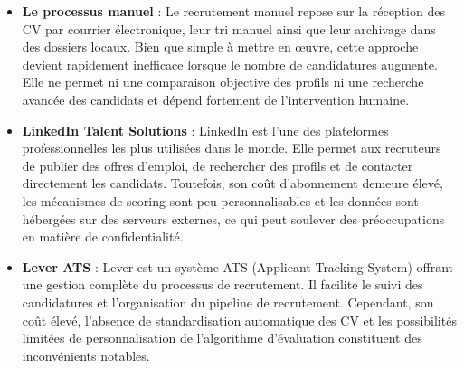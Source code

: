\documentclass[12pt,a4paper,oneside]{report}
\begin{document}
\begin{itemize}
\begin{center}
\end{center}

\section{Étude de l'existant}
\subsection{Analyse de l'existant}

Afin d'identifier les limites des approches actuelles et de justifier la solution proposée, nous avons étudié plusieurs méthodes et plateformes de recrutement couramment utilisées.



\item \textbf{Le processus manuel} : Le recrutement manuel repose sur la réception des CV par courrier électronique, leur tri manuel ainsi que leur archivage dans des dossiers locaux. Bien que simple à mettre en œuvre, cette approche devient rapidement inefficace lorsque le nombre de candidatures augmente. Elle ne permet ni une comparaison objective des profils ni une recherche avancée des candidats et dépend fortement de l'intervention humaine.

\item \textbf{LinkedIn Talent Solutions} : LinkedIn \cite{linkedIn} est l'une des plateformes professionnelles les plus utilisées dans le monde. Elle permet aux recruteurs de publier des offres d'emploi, de rechercher des profils et de contacter directement les candidats. Toutefois, son coût d'abonnement demeure élevé, les mécanismes de scoring sont peu personnalisables et les données sont hébergées sur des serveurs externes, ce qui peut soulever des préoccupations en matière de confidentialité.



\item \textbf{Lever ATS} : Lever \cite{lever} est un système ATS (Applicant Tracking System) offrant une gestion complète du processus de recrutement. Il facilite le suivi des candidatures et l'organisation du pipeline de recrutement. Cependant, son coût élevé, l'absence de standardisation automatique des CV et les possibilités limitées de personnalisation de l'algorithme d'évaluation constituent des inconvénients notables.




\end{itemize}
\end{document}
